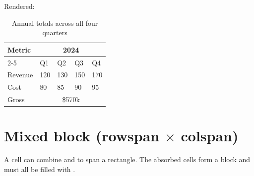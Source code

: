 \documentclass[a4paper,twoside]{article}
\begin{document}
Rendered:
\begin{table}[H]
\centering
\caption{Annual totals across all four quarters}
\vspace{0.5em}
\begin{tabular}{lllll}
\toprule
\multirow{2}{*}{Metric} & \multicolumn{4}{c}{2024} \\
\cmidrule(lr){2-5}
& Q1 & Q2 & Q3 & Q4 \\
\midrule
Revenue & 120 & 130 & 150 & 170 \\
Cost & 80 & 85 & 90 & 95 \\
\midrule
Gross & \multicolumn{4}{c}{\$570k} \\
\bottomrule
\end{tabular}
\end{table}
\section{Mixed block (rowspan \(\times\) colspan)}
A cell can combine  and  to span a rectangle. The absorbed cells
form a  block and must all be filled with \tscodeinline{\textasciitilde{}}.
\end{document}

